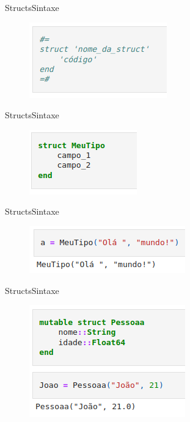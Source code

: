 \documentclass{beamer}
\begin{document}
\begin{frame}{Structs}{Sintaxe}
    \begin{figure}
        \centering
        \includegraphics[scale=0.4]{imagens/struct-ex.png}
        \label{fig:my_label}
    \end{figure}     
\end{frame}

\begin{frame}{Structs}{Sintaxe}
    \begin{figure}
        \centering
        \includegraphics[scale=0.4]{imagens/struct-ex02.png}
        \label{fig:my_label}
    \end{figure}     
\end{frame}

\begin{frame}{Structs}{Sintaxe}
    \begin{figure}
        \centering
        \includegraphics[scale=0.4]{imagens/struct-ex03.png}
        \label{fig:my_label}
    \end{figure}     
\end{frame}

\begin{frame}{Structs}{Sintaxe}
    \begin{figure}
        \centering
        \includegraphics[scale=0.4]{imagens/struct-ex04.png}
        \label{fig:my_label}
    \end{figure}     
\end{frame}
\end{document}
